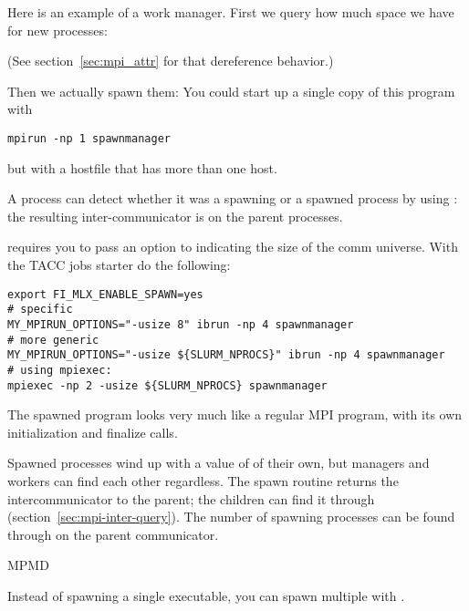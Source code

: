 Here is an example of a work manager.
%
First we query how much space we have for new processes:
%

(See section~\ref{sec:mpi_attr} for that dereference behavior.)

Then we actually spawn them:
%
%
%
You could start up a single copy of this program with 
\begin{verbatim}
mpirun -np 1 spawnmanager
\end{verbatim}
but with a hostfile that has more than one host.

A process can detect whether it was a spawning or a spawned process
by using :
the resulting inter-communicator is 
on the parent processes.

\begin{taccnote}
 requires you to pass an option  to
 indicating the size of the comm universe. With the TACC
jobs starter  do the following:
\begin{verbatim}
export FI_MLX_ENABLE_SPAWN=yes
# specific
MY_MPIRUN_OPTIONS="-usize 8" ibrun -np 4 spawnmanager
# more generic
MY_MPIRUN_OPTIONS="-usize ${SLURM_NPROCS}" ibrun -np 4 spawnmanager
# using mpiexec:
mpiexec -np 2 -usize ${SLURM_NPROCS} spawnmanager
\end{verbatim}
\end{taccnote}
The spawned program looks very much like a regular MPI program, with
its own initialization and finalize calls.

%

Spawned processes wind up with a value of  of their
own, but managers and workers can find each other regardless.
The spawn routine returns the intercommunicator to the parent; the children
can find it through  (section~\ref{sec:mpi-inter-query}).
The number of spawning processes can be found through
 on the parent communicator.

 {MPMD}

Instead of spawning a single executable, you can spawn multiple with
.

